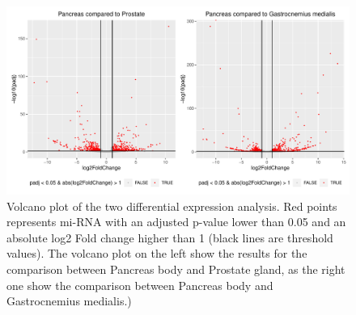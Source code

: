 \documentclass[a4paper, 11pt]{article}
\begin{document}
\begin{figure}[H]
\centering
\includegraphics[width=\columnwidth]{Figures/differential_analysis/volcano.pdf}
\caption{\footnotesize{Volcano plot of the two differential expression analysis. Red points represents mi-RNA with an adjusted p-value lower than 0.05 and an absolute log2 Fold change higher than 1 (black lines are threshold values). The volcano plot on the left show the results for the comparison between Pancreas body and Prostate gland, as the right one show the comparison between Pancreas body and Gastrocnemius medialis.)}}
\label{fig:volcano}
\end{figure}

\begin{multicols}{2}


\end{multicols}
\end{document}
